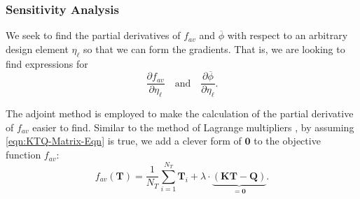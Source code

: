 \subsubsection*{Sensitivity Analysis}

We seek to find the partial derivatives of $f_{av}$ and $\overline{\phi}$ with respect to an arbitrary design element $\eta_{\ell}$ so that we can form the gradients. That is, we are looking to find expressions for $$\displaystyle\frac{\partial f_{av}}{\partial\eta_\ell}\quad\text{and}\quad\displaystyle\frac{\partial\overline{\phi}}{\partial\eta_\ell}.$$

The adjoint method is employed to make the calculation of the partial derivative of $f_{av}$ easier to find. Similar to the method of Lagrange multipliers \cite[]{Johnson2021}, by assuming \eqref{eqn:KTQ-Matrix-Eqn} is true, we add a clever form of $\mathbf{0}$ to the objective function $f_{av}$:
\begin{equation}
	f_{av}\left(\mathbf{T}\right)=\frac{1}{N_T}\sum_{i=1}^{N_T}\mathbf{T}_i+\lambda\cdot\underbrace{\left(\mathbf{K}\mathbf{T}-\mathbf{Q}\right)}_{=\mathbf{0}}.\label{eqn:f_av-AdjointTrick}
\end{equation}